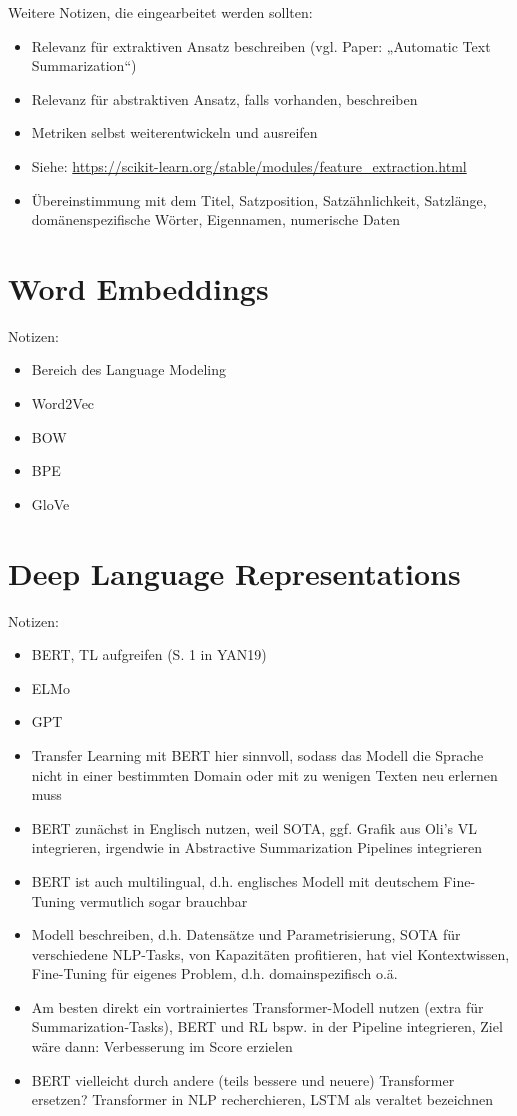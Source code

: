 Weitere Notizen, die eingearbeitet werden sollten:
\begin{itemize}
	\item Relevanz für extraktiven Ansatz beschreiben (vgl. Paper: „Automatic Text Summarization“)
	\item Relevanz für abstraktiven Ansatz, falls vorhanden, beschreiben
	\item Metriken selbst weiterentwickeln und ausreifen
	\item Siehe: \url{https://scikit-learn.org/stable/modules/feature_extraction.html}
	\item Übereinstimmung mit dem Titel, Satzposition, Satzähnlichkeit, Satzlänge, domänenspezifische Wörter, Eigennamen, numerische Daten
\end{itemize}


\section{Word Embeddings}
Notizen:
\begin{itemize}
	\item Bereich des Language Modeling
	\item Word2Vec
	\item BOW
	\item BPE
	\item GloVe
\end{itemize}


\section{Deep Language Representations}
Notizen:
\begin{itemize}
	\item BERT, TL aufgreifen (S. 1 in YAN19)
	\item ELMo
	\item GPT
	\item Transfer Learning mit BERT hier sinnvoll, sodass das Modell die Sprache nicht in einer bestimmten Domain oder mit zu wenigen Texten neu erlernen muss
	\item BERT zunächst in Englisch nutzen, weil SOTA, ggf. Grafik aus Oli's VL integrieren, irgendwie in Abstractive Summarization Pipelines integrieren
	\item BERT ist auch multilingual, d.h. englisches Modell mit deutschem Fine-Tuning vermutlich sogar brauchbar
	\item Modell beschreiben, d.h. Datensätze und Parametrisierung, SOTA für verschiedene NLP-Tasks, von Kapazitäten profitieren, hat viel Kontextwissen, Fine-Tuning für eigenes Problem, d.h. domainspezifisch o.ä.
	\item Am besten direkt ein vortrainiertes Transformer-Modell nutzen (extra für Summarization-Tasks), BERT und RL bspw. in der Pipeline integrieren, Ziel wäre dann: Verbesserung im Score erzielen
	\item BERT vielleicht durch andere (teils bessere und neuere) Transformer ersetzen? Transformer in NLP recherchieren, LSTM als veraltet bezeichnen
\end{itemize}
